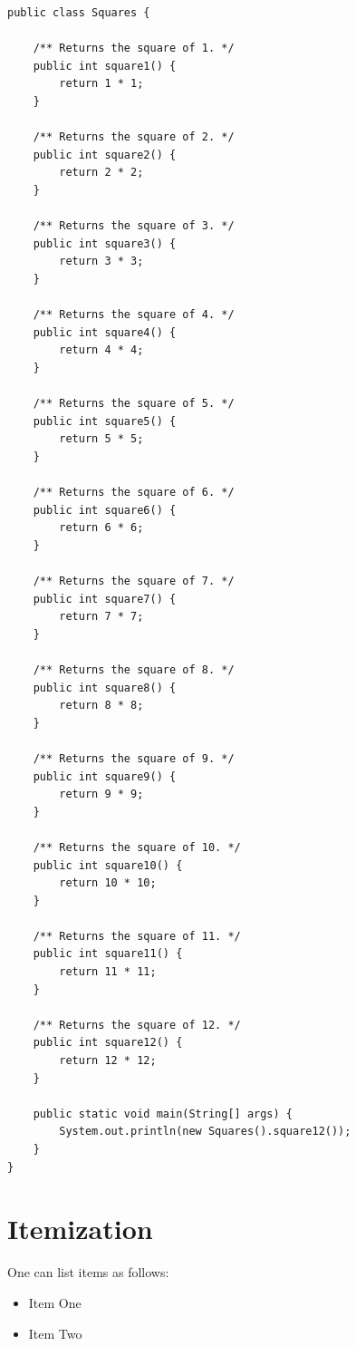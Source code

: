 \begin{verbatim}
public class Squares {

    /** Returns the square of 1. */
    public int square1() {
        return 1 * 1;
    }

    /** Returns the square of 2. */
    public int square2() {
        return 2 * 2;
    }

    /** Returns the square of 3. */
    public int square3() {
        return 3 * 3;
    }

    /** Returns the square of 4. */
    public int square4() {
        return 4 * 4;
    }

    /** Returns the square of 5. */
    public int square5() {
        return 5 * 5;
    }

    /** Returns the square of 6. */
    public int square6() {
        return 6 * 6;
    }

    /** Returns the square of 7. */
    public int square7() {
        return 7 * 7;
    }

    /** Returns the square of 8. */
    public int square8() {
        return 8 * 8;
    }

    /** Returns the square of 9. */
    public int square9() {
        return 9 * 9;
    }

    /** Returns the square of 10. */
    public int square10() {
        return 10 * 10;
    }

    /** Returns the square of 11. */
    public int square11() {
        return 11 * 11;
    }

    /** Returns the square of 12. */
    public int square12() {
        return 12 * 12;
    }

    public static void main(String[] args) {
        System.out.println(new Squares().square12());
    }
}
\end{verbatim}
\label{lst:long}

\section{Itemization}

One can list items as follows:

\begin{ltgexample}
\begin{itemize}
  \item Item One
  \item Item Two
\end{itemize}
\end{ltgexample}

